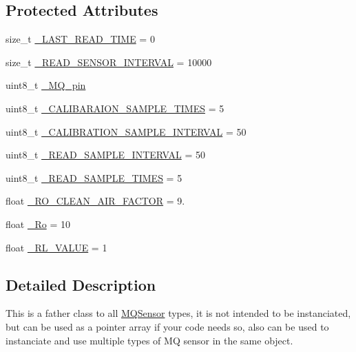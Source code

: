 \subsection*{Protected Attributes}
\begin{DoxyCompactItemize}
\item 
size\+\_\+t \hyperlink{class_m_q_sensor_a464b0db94d80b771efca70a0eb58f951}{\+\_\+\+L\+A\+S\+T\+\_\+\+R\+E\+A\+D\+\_\+\+T\+I\+ME} = 0
\item 
size\+\_\+t \hyperlink{class_m_q_sensor_a4a8e710f1bc61afb702d26ceb1366f11}{\+\_\+\+R\+E\+A\+D\+\_\+\+S\+E\+N\+S\+O\+R\+\_\+\+I\+N\+T\+E\+R\+V\+AL} = 10000
\item 
uint8\+\_\+t \hyperlink{class_m_q_sensor_aaa75c5a8dbb6b8bfba63a7b8749acd82}{\+\_\+\+M\+Q\+\_\+pin}
\item 
uint8\+\_\+t \hyperlink{class_m_q_sensor_ae04756d16f8d90e492fdb48c5ac4e930}{\+\_\+\+C\+A\+L\+I\+B\+A\+R\+A\+I\+O\+N\+\_\+\+S\+A\+M\+P\+L\+E\+\_\+\+T\+I\+M\+ES} = 5
\item 
uint8\+\_\+t \hyperlink{class_m_q_sensor_a440f40e2d8109c9cda26ce2b3d8ff564}{\+\_\+\+C\+A\+L\+I\+B\+R\+A\+T\+I\+O\+N\+\_\+\+S\+A\+M\+P\+L\+E\+\_\+\+I\+N\+T\+E\+R\+V\+AL} = 50
\item 
uint8\+\_\+t \hyperlink{class_m_q_sensor_a7dcb6e9f9ff88b498d7b47dd33b0809f}{\+\_\+\+R\+E\+A\+D\+\_\+\+S\+A\+M\+P\+L\+E\+\_\+\+I\+N\+T\+E\+R\+V\+AL} = 50
\item 
uint8\+\_\+t \hyperlink{class_m_q_sensor_a3c6ba8a07087b67ee99941bced73e940}{\+\_\+\+R\+E\+A\+D\+\_\+\+S\+A\+M\+P\+L\+E\+\_\+\+T\+I\+M\+ES} = 5
\item 
float \hyperlink{class_m_q_sensor_adc7e7af2139868a784d31d27d73b7df3}{\+\_\+\+R\+O\+\_\+\+C\+L\+E\+A\+N\+\_\+\+A\+I\+R\+\_\+\+F\+A\+C\+T\+OR} = 9.
\item 
float \hyperlink{class_m_q_sensor_ade2e483ebc557d1caf753d41a8b3afde}{\+\_\+\+Ro} = 10
\item 
float \hyperlink{class_m_q_sensor_a2cf9585b95f5beaac2dc8edbab7eff42}{\+\_\+\+R\+L\+\_\+\+V\+A\+L\+UE} = 1
\end{DoxyCompactItemize}


\subsection{Detailed Description}
This is a father class to all \hyperlink{class_m_q_sensor}{M\+Q\+Sensor} types, it is not intended to be instanciated, but can be used as a pointer array if your code needs so, also can be used to instanciate and use multiple types of MQ sensor in the same object.

